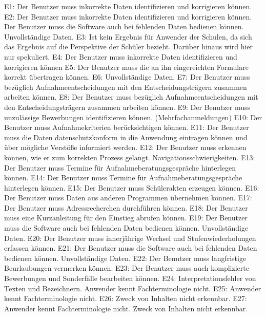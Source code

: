 E1: Der Benutzer muss inkorrekte Daten identifizieren und korrigieren können.
E2: Der Benutzer muss inkorrekte Daten identifizieren und korrigieren können. Der Benutzer muss die Software auch bei fehlenden Daten bedienen können. Unvollständige Daten.
E3: Ist kein Ergebnis für Anwender der Schulen, da sich das Ergebnis auf die Perspektive der Schüler bezieht. Darüber hinaus wird hier nur spekuliert.
E4: Der Benutzer muss inkorrekte Daten identifizieren und korrigieren können
E5: Der Benutzer muss die an ihn eingereichten Formulare korrekt übertragen können.
E6: Unvollständige Daten.
E7: Der Benutzer muss bezüglich Aufnahmeentscheidungen mit den Entscheidungsträgern zusammen arbeiten können.
E8: Der Benutzer muss bezüglich Aufnahmeentscheidungen mit den Entscheidungsträgern zusammen arbeiten können.
E9: Der Benutzer muss unzulässige Bewerbungen identifizieren können. (Mehrfachanmeldungen)
E10: Der Benutzer muss Aufnahmekriterien berücksichtigen können.
E11: Der Benutzer muss die Daten datenschutzkonform in die Anwendung eintragen können und über mögliche Verstöße informiert werden.
E12: Der Benutzer muss erkennen können, wie er zum korrekten Prozess gelangt. Navigationsschwierigkeiten.
E13: Der Benutzer muss Termine für Aufnahmeberatungsgespräche hinterlegen können.
E14: Der Benutzer muss Termine für Aufnahmeberatungsgespräche hinterlegen können.
E15: Der Benutzer muss Schülerakten erzeugen können.
E16: Der Benutzer muss Daten aus anderen Programmen übernehmen können.
E17: Der Benutzer muss Adressrecherchen durchführen können.
E18: Der Benutzer muss eine Kurzanleitung für den Einstieg abrufen können.
E19: Der Benutzer muss die Software auch bei fehlenden Daten bedienen können. Unvollständige Daten.
E20: Der Benutzer muss innerjährige Wechsel und Stufenwiederholungen erfassen können.
E21: Der Benutzer muss die Software auch bei fehlenden Daten bedienen können. Unvollständige Daten.
E22: Der Benutzer muss langfristige Beurlaubungen vermerken können.
E23: Der Benutzer muss {auch komplizierte Bewerbungen und Sonderfälle bearbeiten können. }
E24: Interpretationsfehler von Texten und Bezeichnern. Anwender kennt Fachterminologie nicht.
E25: Anwender kennt Fachterminologie nicht.
E26: Zweck von Inhalten nicht erkennbar.
E27: Anwender kennt Fachterminologie nicht. Zweck von Inhalten nicht erkennbar.

